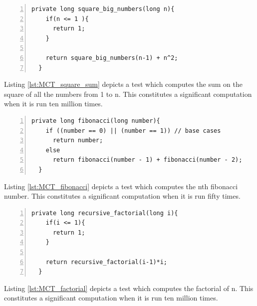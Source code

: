 \documentclass{article} %
\begin{document}
\begin{lstlisting}[caption={Measuring Computation Time - Sum of Squares},label={lst:MCT_square_sum},numbers=left]
  private long square_big_numbers(long n){
    if(n <= 1 ){
      return 1;
    }

    return square_big_numbers(n-1) + n^2;
  }
\end{lstlisting}
Listing \ref{lst:MCT_square_sum} depicts a test which computes the sum on the square of all the numbers from 1 to n. This constitutes a significant computation when it is run ten million times.

\begin{lstlisting}[caption={Measuring Computation Time - Fibonacci},label={lst:MCT_fibonacci},numbers=left]
private long fibonacci(long number){
    if ((number == 0) || (number == 1)) // base cases
      return number;
    else
      return fibonacci(number - 1) + fibonacci(number - 2);
  }
\end{lstlisting}
Listing \ref{lst:MCT_fibonacci} depicts a test which computes the nth fibonacci number. This constitutes a significant computation when it is run fifty times.

\begin{lstlisting}[caption={Measuring Computation Time - Factorial},label={lst:MCT_factorial},numbers=left]
  private long recursive_factorial(long i){
    if(i <= 1){
      return 1;
    }

    return recursive_factorial(i-1)*i;
  }
\end{lstlisting}
Listing \ref{lst:MCT_factorial} depicts a test which computes the factorial of n. This constitutes a significant computation when it is run ten million times.
\end{document}
